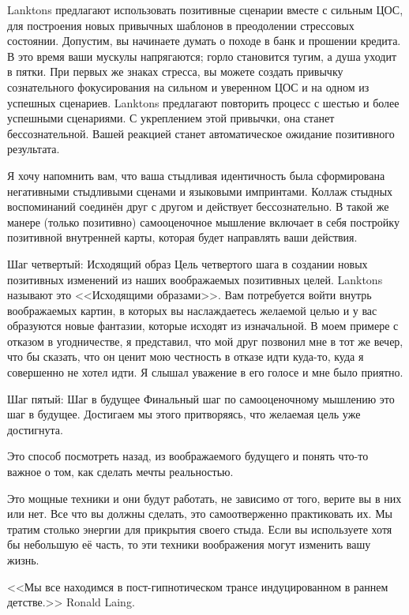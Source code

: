 \documentclass[10pt, fleqn]{article}
\begin{document}
Lanktons предлагают использовать позитивные сценарии вместе с сильным ЦОС, для построения новых привычных шаблонов в преодолении стрессовых состоянии. Допустим, вы начинаете думать о походе в банк и прошении кредита. В это время ваши мускулы напрягаются; горло становится тугим, а душа уходит в пятки. При первых же знаках стресса, вы можете создать привычку сознательного фокусирования на сильном и уверенном ЦОС и на одном из успешных сценариев. Lanktons предлагают повторить процесс с шестью и более успешными сценариями. С укреплением этой привычки, она станет бессознательной. Вашей реакцией станет автоматическое ожидание позитивного результата.

Я хочу напомнить вам, что ваша стыдливая идентичность была сформирована негативными стыдливыми сценами и языковыми импринтами. Коллаж стыдных воспоминаний соединён друг с другом и действует бессознательно. В такой же манере (только позитивно) самооценочное мышление включает в себя постройку позитивной внутренней карты, которая будет направлять ваши действия.

Шаг четвертый: Исходящий образ
Цель четвертого шага в создании новых позитивных изменений из наших воображаемых позитивных целей. Lanktons называют это <<Исходящими образами>>. Вам потребуется войти внутрь воображаемых картин, в которых вы наслаждаетесь желаемой целью и у вас образуются новые фантазии, которые исходят из изначальной. В моем примере с отказом в угодничестве, я представил, что мой друг позвонил мне в тот же вечер, что бы сказать, что он ценит мою честность в отказе идти куда-то, куда я совершенно не хотел идти. Я слышал уважение в его голосе и мне было приятно.

Шаг пятый: Шаг в будущее
Финальный шаг по самооценочному мышлению это шаг в будущее. Достигаем мы этого притворяясь, что желаемая цель уже достигнута.

Это способ посмотреть назад, из воображаемого будущего и понять что-то важное о том, как сделать мечты реальностью.

Это мощные техники и они будут работать, не зависимо от того, верите вы в них или нет. Все что вы должны сделать, это самоотверженно практиковать их. Мы тратим столько энергии для прикрытия своего стыда. Если вы используете хотя бы небольшую её часть, то эти техники воображения могут изменить вашу жизнь.


<<Мы все находимся в пост-гипнотическом трансе индуцированном в раннем детстве.>> Ronald Laing.
\end{document}
